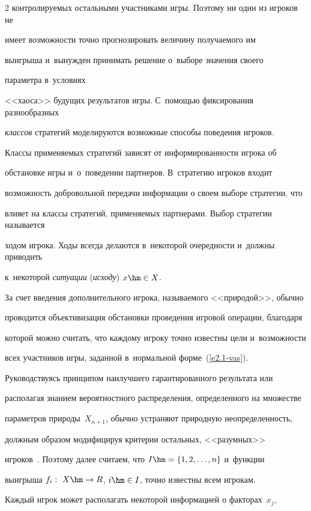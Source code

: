\begin{multicols}{2}
контролируемых остальными участниками игры. Поэтому ни один из игроков не

имеет возможности точно прогнозировать величину получаемого им

выигрыша и~вынужден принимать решение о~выборе значения своего

па\-ра\-мет\-ра в~условиях

<<хаоса>> будущих результатов игры. С~по\-мощью фиксирования разнообразных

\textit{классов} стратегий моделируются возможные способы поведения игроков.

Классы применяемых стратегий зависят от информированности игрока об

обстановке игры и~о~поведении партнеров. В~стратегию игроков входит

возможность добровольной передачи информации о своем выборе стратегии, что

влияет на классы стратегий, применяемых партнерами. Выбор стратегии называется

ходом игрока. Ходы всегда делаются в~некоторой очередности и~должны приводить

к~некоторой \textit{ситуации} (\textit{исходу}) $x\hm\in X$.



    За счет введения дополнительного игрока, называемого <<природой>>, обычно

проводится объ\-ективизация обстановки проведения игровой операции, благодаря

которой можно считать, что каждо\-му игроку точно известны цели и~возможности

всех участников игры, заданной в~нормальной форме~(\ref{e2.1-vas}).

Руководствуясь принципом наилучшего гарантированного результата или

располагая знанием вероятностного распределения, определенного на множестве

параметров природы~$X_{n+1}$, обычно устраняют природную неопределенность,

должным образом модифицируя критерии остальных, <<разумных>>

игроков~\cite{1-vas}. Поэтому далее считаем, что $I\hm= \{1,2,\ldots, n\}$ и~функции

выигрыша $f_i:\ X\hm\to R$, $i\hm\in I$, точно известны всем игрокам.



    Каждый игрок может располагать некоторой информацией о факторах~$x_j$,


\end{multicols}
